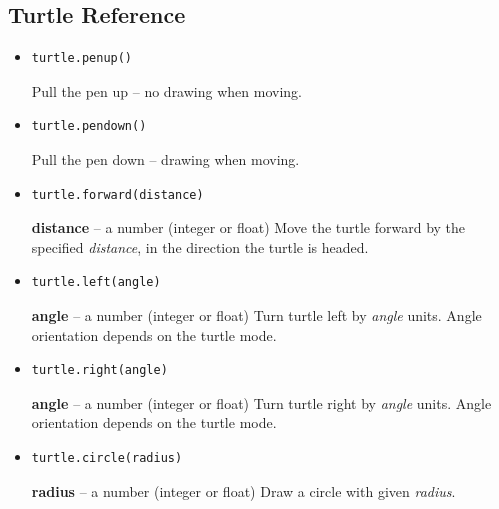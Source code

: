 \documentclass[a4paper]{article}
\begin{document}
\subsection{Turtle Reference}
\label{themeMethod}
\begin{itemize}


\item
\begin{lstlisting}
turtle.penup()
\end{lstlisting}
Pull the pen up – no drawing when moving.

\item
\begin{lstlisting}
turtle.pendown()
\end{lstlisting}
Pull the pen down – drawing when moving.

\item
\begin{lstlisting}
turtle.forward(distance)
\end{lstlisting}
\textbf{distance} – a number (integer or float) \newline
Move the turtle forward by the specified \textit{distance}, in the direction the turtle is headed.

\item
\begin{lstlisting}
turtle.left(angle)
\end{lstlisting}
\textbf{angle} – a number (integer or float) \newline
Turn turtle left by \textit{angle} units. Angle orientation depends on the turtle mode.

\item
\begin{lstlisting}
turtle.right(angle)
\end{lstlisting}
\textbf{angle} – a number (integer or float) \newline
Turn turtle right by \textit{angle} units. Angle orientation depends on the turtle mode.

\item
\begin{lstlisting}
turtle.circle(radius)
\end{lstlisting}
\textbf{radius} – a number (integer or float)\newline
Draw a circle with given \textit{radius}. 


\end{itemize}
\end{document}
